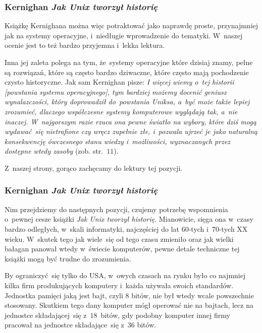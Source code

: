 \documentclass[10pt,t]{beamer}
\begin{document}
\begin{frame}
  \frametitle{Kernighan \textit{Jak Unix tworzył historię}}


  Książkę Kernighana można więc potraktować jako naprawdę proste,
  przynajmniej jak na systemy operacyjne, i~niedługie wprowadzenie do
  tematyki. W~naszej ocenie jest to też bardzo przyjemna i~lekka lektura.

  Inna jej zaleta polega na tym, że~systemy operacyjne które dzisiaj znamy,
  pełne są rozwiązań, które są często bardzo dziwaczne, które często mają
  pochodzenie czysto historyczne. Jak sam Kernighan pisze:
  \textit{I więcej wiemy o~tej historii [powstania systemu operacyjnego],
    tym bardziej możemy docenić geniusz wynalazczości, który doprowadził
    do~powstania Uniksa, a~być może także lepiej
    zrozumieć, dlaczego współczesne systemy komputerowe wyglądają tak,
    a~nie inaczej. W~najgorszym razie rzuca ona pewne światło na wybory,
    które dziś mogą wydawać~się nietrafione czy wręcz zupełnie złe,
    i~pozwala ujrzeć je jako naturalną konsekwencję ówczesnego stanu wiedzy
    i~możliwości, wyznaczanych przez dostępne wtedy zasoby}
  (zob. str.~$11$).

  Z~naszej strony, gorąco zachęcamy do lektury tej pozycji.

\end{frame}





\begin{frame}
  \frametitle{Kernighan \textit{Jak Unix tworzył historię}}


  Nim przejdziemy do następnych pozycji, czujemy potrzebę wspomnienia
  o~pewnej cesze książki \textit{Jak Unix tworzył historię}. Mianowicie,
  sięga ona w~czasy bardzo odległych, w~skali informatyki, najczęściej
  do lat $60$-tych i~$70$-tych XX wieku. W~skutek tego jak wiele~się od tego
  czasu zmieniło oraz jak wielki bałagan panował wtedy w~świecie komputerów,
  pewne detale techniczne tej książki mogą być trudne do zrozumienia.

  By ograniczyć~się tylko do USA, w~owych czasach na rynku było co najmniej
  kilka firm produkujących komputery i~każda używała swoich standardów.
  Jednostka pamięci jaką jest bajt, czyli $8$ bitów, nie był wtedy wcale
  powszechnie stosowany. Skutkiem tego dany komputer mógł operować nie na
  bajtach, lecz na jednostce składającej~się z~$18$~bitów, gdy podobny
  komputer innej firmy pracował na jednostce składające~się z~$36$ bitów.

\end{frame}
\end{document}
